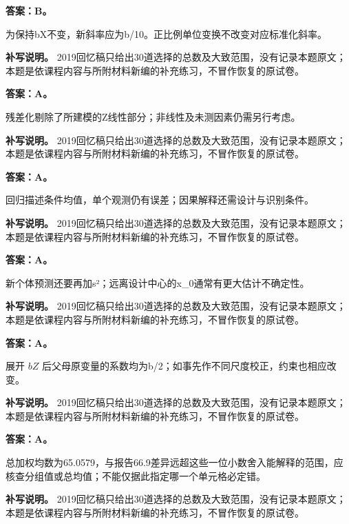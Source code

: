 
\textbf{答案：B。}

为保持bX不变，新斜率应为b/10。正比例单位变换不改变对应标准化斜率。


\textbf{补写说明。} 2019回忆稿只给出30道选择的总数及大致范围，没有记录本题原文；本题是依课程内容与所附材料新编的补充练习，不冒作恢复的原试卷。



\textbf{答案：A。}

残差化剔除了所建模的Z线性部分；非线性及未测因素仍需另行考虑。


\textbf{补写说明。} 2019回忆稿只给出30道选择的总数及大致范围，没有记录本题原文；本题是依课程内容与所附材料新编的补充练习，不冒作恢复的原试卷。



\textbf{答案：A。}

回归描述条件均值，单个观测仍有误差；因果解释还需设计与识别条件。


\textbf{补写说明。} 2019回忆稿只给出30道选择的总数及大致范围，没有记录本题原文；本题是依课程内容与所附材料新编的补充练习，不冒作恢复的原试卷。



\textbf{答案：A。}

新个体预测还要再加s²；远离设计中心的x\_0通常有更大估计不确定性。


\textbf{补写说明。} 2019回忆稿只给出30道选择的总数及大致范围，没有记录本题原文；本题是依课程内容与所附材料新编的补充练习，不冒作恢复的原试卷。



\textbf{答案：A。}

展开 \(bZ\) 后父母原变量的系数均为b/2；如事先作不同尺度校正，约束也相应改变。


\textbf{补写说明。} 2019回忆稿只给出30道选择的总数及大致范围，没有记录本题原文；本题是依课程内容与所附材料新编的补充练习，不冒作恢复的原试卷。



\textbf{答案：A。}

总加权均数为65.0579，与报告66.9差异远超这些一位小数舍入能解释的范围，应核查分组值或总均值；不能仅据此指定哪一个单元格必定错。


\textbf{补写说明。} 2019回忆稿只给出30道选择的总数及大致范围，没有记录本题原文；本题是依课程内容与所附材料新编的补充练习，不冒作恢复的原试卷。


